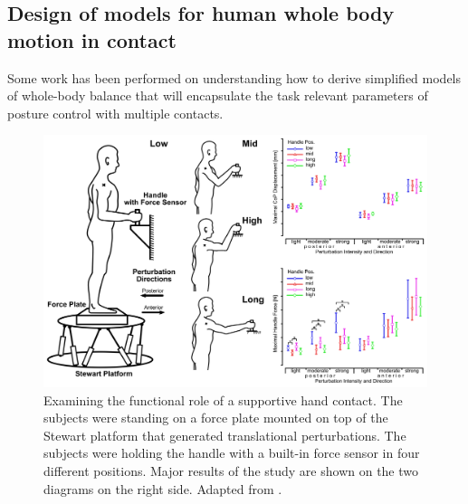 \documentclass[final,5p,twocolumn]{elsarticle}
\begin{document}
\subsection{Design of models for human whole body motion in contact}
Some work has been performed on understanding how to derive simplified models of whole-body balance that will encapsulate the task relevant parameters of posture control with multiple contacts. 

\begin{figure}
\centering
\includegraphics[width=\linewidth]{images/exp1_JSI.png}
\caption{Examining the functional role of a supportive hand contact. The subjects were standing on a force plate mounted on top of the Stewart platform that generated translational perturbations. The subjects were holding the handle with a built-in force sensor in four different positions. Major results of the study are shown on the two diagrams on the right side. Adapted from \cite{babivc2014effects}.}
\label{fig:exp_paper_W2}
\end{figure}

\end{document}
